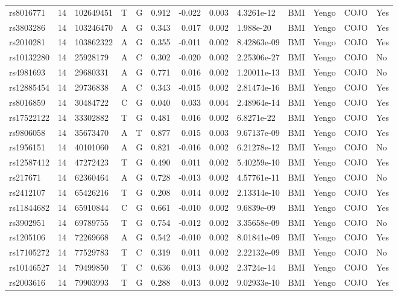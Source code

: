 \documentclass[11pt,twoside]{bristolthesis}
\begin{document}
\begin{longtable}[t]{lrlllrrrlllll}
rs8016771 & 14 & 102649451 & T & G & 0.912 & -0.022 & 0.003 & 4.3261e-12 & BMI & Yengo & COJO & Yes\\
rs3803286 & 14 & 103246470 & A & G & 0.343 & 0.017 & 0.002 & 1.988e-20 & BMI & Yengo & COJO & Yes\\
rs2010281 & 14 & 103862322 & A & G & 0.355 & -0.011 & 0.002 & 8.42863e-09 & BMI & Yengo & COJO & Yes\\
rs10132280 & 14 & 25928179 & A & C & 0.302 & -0.020 & 0.002 & 2.25306e-27 & BMI & Yengo & COJO & No\\
\addlinespace
rs4981693 & 14 & 29680331 & A & G & 0.771 & 0.016 & 0.002 & 1.20011e-13 & BMI & Yengo & COJO & No\\
rs12885454 & 14 & 29736838 & A & C & 0.343 & -0.015 & 0.002 & 2.81474e-16 & BMI & Yengo & COJO & Yes\\
rs8016859 & 14 & 30484722 & C & G & 0.040 & 0.033 & 0.004 & 2.48964e-14 & BMI & Yengo & COJO & Yes\\
rs17522122 & 14 & 33302882 & T & G & 0.481 & 0.016 & 0.002 & 6.8271e-22 & BMI & Yengo & COJO & Yes\\
rs9806058 & 14 & 35673470 & A & T & 0.877 & 0.015 & 0.003 & 9.67137e-09 & BMI & Yengo & COJO & Yes\\
\addlinespace
rs1956151 & 14 & 40101060 & A & G & 0.821 & -0.016 & 0.002 & 6.21278e-12 & BMI & Yengo & COJO & No\\
rs12587412 & 14 & 47272423 & T & G & 0.490 & 0.011 & 0.002 & 5.40259e-10 & BMI & Yengo & COJO & Yes\\
rs217671 & 14 & 62360464 & A & G & 0.728 & -0.013 & 0.002 & 4.57761e-11 & BMI & Yengo & COJO & No\\
rs2412107 & 14 & 65426216 & T & G & 0.208 & 0.014 & 0.002 & 2.13314e-10 & BMI & Yengo & COJO & Yes\\
rs11844682 & 14 & 65910844 & C & G & 0.661 & -0.010 & 0.002 & 9.6839e-09 & BMI & Yengo & COJO & Yes\\
\addlinespace
rs3902951 & 14 & 69789755 & T & G & 0.754 & -0.012 & 0.002 & 3.35658e-09 & BMI & Yengo & COJO & No\\
rs1205106 & 14 & 72269668 & A & G & 0.542 & -0.010 & 0.002 & 8.01841e-09 & BMI & Yengo & COJO & Yes\\
rs17105272 & 14 & 77529783 & T & C & 0.319 & 0.011 & 0.002 & 2.22132e-09 & BMI & Yengo & COJO & No\\
rs10146527 & 14 & 79499850 & T & C & 0.636 & 0.013 & 0.002 & 2.3724e-14 & BMI & Yengo & COJO & Yes\\
rs2003616 & 14 & 79903993 & T & G & 0.288 & 0.013 & 0.002 & 9.02933e-10 & BMI & Yengo & COJO & Yes\\

\end{longtable}
\end{document}
